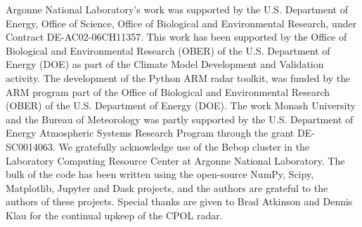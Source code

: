 \documentclass[journal abbreviation, manuscript]{copernicus}
\begin{document}









\begin{acknowledgements}
  Argonne National Laboratory’s work was supported by the U.S. Department of Energy, Office of Science, Office of Biological and Environmental Research, under Contract DE-AC02-06CH11357. This work has been supported by the Office of Biological and Environmental Research (OBER) of the U.S. Department of Energy (DOE) as part of the Climate Model Development and Validation activity. The development of the Python ARM radar toolkit, was funded by the ARM program part of the Office of Biological and Environmental Research (OBER) of the U.S. Department of Energy (DOE). The work Monash University and the Bureau of Meteorology was partly supported by the U.S. Department of Energy Atmospheric Systems Research Program through the grant DE-SC0014063. We gratefully acknowledge use of the Bebop cluster in the Laboratory Computing Resource Center at Argonne National Laboratory. The bulk of the code has been written using the open-source NumPy, Scipy, Matplotlib, Jupyter and Dask projects, and the authors are grateful to the authors of these projects. Special thanks are given to Brad Atkinson and Dennis Klau for the continual upkeep of the CPOL radar. 
    
\end{acknowledgements}
\end{document}
